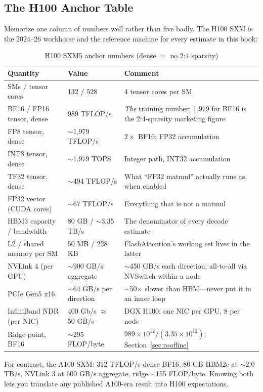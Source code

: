 \subsection{The H100 Anchor Table}

Memorize one column of numbers well rather than five badly. The H100 SXM is the 2024--26 workhorse and the reference machine for every estimate in this book:

\begin{table}[H]
\centering
\small
\caption{H100 SXM5 anchor numbers (dense $=$ no 2:4 sparsity)}
\label{tab:h100_anchor}
\begin{tabularx}{\textwidth}{llX}
\toprule
\textbf{Quantity} & \textbf{Value} & \textbf{Comment} \\
\midrule
SMs / tensor cores & 132 / 528 & 4 tensor cores per SM \\
BF16 / FP16 tensor, dense & 989 TFLOP/s & \textit{The} training number; 1{,}979 for BF16 is the 2:4-sparsity marketing figure \\
FP8 tensor, dense & $\sim$1{,}979 TFLOP/s & $2\times$ BF16; FP32 accumulation \\
INT8 tensor, dense & $\sim$1{,}979 TOPS & Integer path, INT32 accumulation \\
TF32 tensor, dense & $\sim$494 TFLOP/s & What ``FP32 matmul'' actually runs as, when enabled \\
FP32 vector (CUDA cores) & $\sim$67 TFLOP/s & Everything that is not a matmul \\
HBM3 capacity / bandwidth & 80 GB / $\sim$3.35 TB/s & The denominator of every decode estimate \\
L2 / shared memory per SM & 50 MB / 228 KB & FlashAttention's working set lives in the latter \\
NVLink 4 (per GPU) & $\sim$900 GB/s aggregate & $\sim$450 GB/s each direction; all-to-all via NVSwitch within a node \\
PCIe Gen5 x16 & $\sim$64 GB/s per direction & $\sim$50$\times$ slower than HBM---never put it in an inner loop \\
InfiniBand NDR (per NIC) & 400 Gb/s $\approx$ 50 GB/s & DGX H100: one NIC per GPU, 8 per node \\
Ridge point, BF16 & $\sim$295 FLOP/byte & $989 \times 10^{12} / (3.35 \times 10^{12})$; Section~\ref{sec:roofline} \\
\bottomrule
\end{tabularx}
\end{table}

For contrast, the A100 SXM: 312 TFLOP/s dense BF16, 80 GB HBM2e at $\sim$2.0 TB/s, NVLink 3 at 600 GB/s aggregate, ridge $\sim$155 FLOP/byte. Knowing both lets you translate any published A100-era result into H100 expectations.

